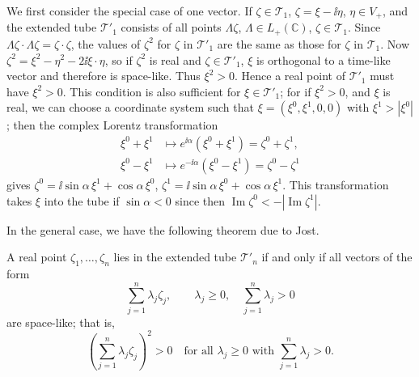 We first consider the special case of one vector.  If $\zeta\in\mathcal{T}_{1}$,
$\zeta=\xi-\ii\eta$, $\eta\in V_{+}$, and the extended tube $\mathcal{T}'_{1}$
consists of all points $\Lambda\zeta$, $\Lambda\in L_{+}(\mathbb C)$,
$\zeta\in\mathcal{T}_{1}$.  Since $\Lambda\zeta\mathbin{\cdot}\Lambda\zeta
=\zeta\mathbin{\cdot}\zeta$, the values of $\zeta^2$ for $\zeta$ in
$\mathcal{T}'_{1}$ are the same as those for $\zeta$ in $\mathcal{T}_{1}$.
Now $\zeta^2=\xi^2-\eta^2-2\ii\xi\mathbin{\cdot}\eta$, so if $\zeta^2$ is
real and $\zeta\in\mathcal{T}'_{1}$, $\xi$ is orthogonal to a time-like
vector and therefore is space-like.  Thus $\xi^2>0$.  Hence a real point of
$\mathcal{T}'_{1}$ must have $\xi^2>0$.  This condition is also sufficient for
$\xi\in\mathcal{T}'_{1}$; for if $\xi^2>0$, and $\xi$ is real, we can choose
a coordinate system such that $\xi=(\xi^0,\xi^1,0,0)$ with
$\xi^1>|\xi^0|$; then the complex Lorentz transformation
\begin{equation}
\begin{aligned}
  \xi^0+\xi^1&\longmapsto
    e^{\ii\alpha}(\xi^0+\xi^1)=\zeta^0+\zeta^1,\\
  \xi^0-\xi^1&\longmapsto
    e^{-\ii\alpha}(\xi^0-\xi^1)=\zeta^0-\zeta^1
\end{aligned}
\tag{2-91}\label{eq:ch2-complex-boost}
\end{equation}
gives $\zeta^0=\ii\sin\alpha\,\xi^1+\cos\alpha\,\xi^0$,
$\zeta^1=\ii\sin\alpha\,\xi^0+\cos\alpha\,\xi^1$.  This transformation
takes $\xi$ into the tube if $\sin\alpha<0$ since then
$\operatorname{Im}\zeta^0<-|\operatorname{Im}\zeta^1|$.

In the general case, we have the following theorem due to Jost.

\begin{theorem}\label{thm:ch2-12-jost}
A real point
$\zeta_1,\ldots,\zeta_n$ lies in the extended tube $\mathcal{T}'_{n}$ if and
only if all vectors of the form
\begin{equation*}
  \sum_{j=1}^{n}\lambda_j\zeta_j,
  \qquad \lambda_j\geq0,\quad \sum_{j=1}^{n}\lambda_j>0
\end{equation*}
are space-like; that is,
\begin{equation}
  \left(\sum_{j=1}^{n}\lambda_j\zeta_j\right)^2>0
  \quad\text{for all }\lambda_j\geq0\text{ with }\sum_{j=1}^{n}\lambda_j>0 .
  \tag{2-92}\label{eq:ch2-jost-condition}
\end{equation}
\end{theorem}

